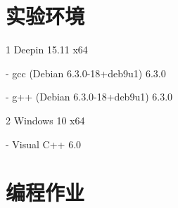 \documentclass[a4paper,UTF8]{article}
\begin{document}
\courseheader
{}

\setlength{\itemsep}{3\parskip}

\section{实验环境} 
\item[1] Deepin 15.11 x64
\item[-] gcc (Debian 6.3.0-18+deb9u1) 6.3.0
\item[-] g++ (Debian 6.3.0-18+deb9u1) 6.3.0
\item[2] Windows 10 x64
\item[-] Visual C++ 6.0

\section{编程作业}
\end{document}
